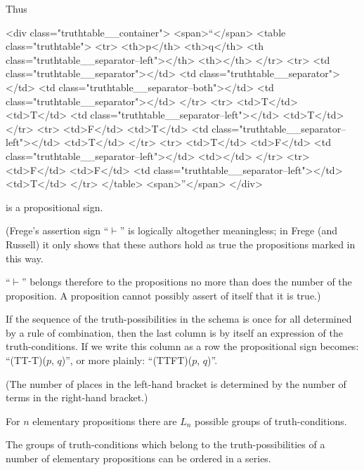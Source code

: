 {Thus \exempliGratia

<div class="truthtable__container">
    <span>``</span>
    <table class="truthtable">
        <tr>
            <th>p</th>
            <th>q</th>
            <th class="truthtable__separator--left"></th>
            <th></th>
        </tr>
        <tr>
            <td class="truthtable__separator"></td>
            <td class="truthtable__separator"></td>
            <td class="truthtable__separator--both"></td>
            <td class="truthtable__separator"></td>
        </tr>
        <tr>
            <td>T</td>
            <td>T</td>
            <td class="truthtable__separator--left"></td>
            <td>T</td>
        </tr>
        <tr>
            <td>F</td>
            <td>T</td>
            <td class="truthtable__separator--left"></td>
            <td>T</td>
        </tr>
        <tr>
            <td>T</td>
            <td>F</td>
            <td class="truthtable__separator--left"></td>
            <td></td>
        </tr>
        <tr>
            <td>F</td>
            <td>F</td>
            <td class="truthtable__separator--left"></td>
            <td>T</td>
        </tr>
    </table>
    <span>''</span>
</div>

is a propositional sign.

(Frege's assertion sign ``$\vdash$'' is logically altogether
meaningless; in Frege (and Russell) it only shows
that these authors hold as true the propositions
marked in this way.

``$\vdash$'' belongs therefore to the propositions no
more than does the number of the proposition. A
proposition cannot possibly assert of itself that it
is true.)

If the sequence of the truth-possibilities in the
schema is once for all determined by a rule of
combination, then the last column is by itself an
expression of the truth-conditions. If we write
this column as a row the propositional sign becomes:
``(TT-T)($p$, $q$)'', or more plainly: ``(TTFT)($p$, $q$)''.

(The number of places in the left-hand bracket
is determined by the number of terms in the right-hand
bracket.)}


{For $n$ elementary propositions there are $L_{n}$
possible groups of truth-con\-di\-tions.

The groups of truth-conditions which belong to
the truth-pos\-si\-bil\-i\-ties of a number of elementary
propositions can be ordered in a series.}


